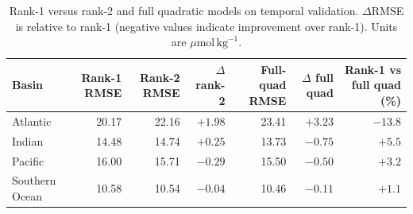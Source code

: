 \begin{table}[htbp]
\centering
\caption{Rank-1 versus rank-2 and full quadratic models on temporal validation. $\Delta$RMSE is relative to rank-1 (negative values indicate improvement over rank-1). Units are $\mu\mathrm{mol}\,\mathrm{kg}^{-1}$.}
\label{tab:rank_compare}
\begin{tabular}{lrrrrrr}
\toprule
Basin & Rank-1 RMSE & Rank-2 RMSE & $\Delta$ rank-2 & Full-quad RMSE & $\Delta$ full quad & Rank-1 vs full quad (\%) \\
\midrule
Atlantic & 20.17 & 22.16 & $+1.98$ & 23.41 & $+3.23$ & $-13.8$ \\
Indian & 14.48 & 14.74 & $+0.25$ & 13.73 & $-0.75$ & $+5.5$ \\
Pacific & 16.00 & 15.71 & $-0.29$ & 15.50 & $-0.50$ & $+3.2$ \\
Southern Ocean & 10.58 & 10.54 & $-0.04$ & 10.46 & $-0.11$ & $+1.1$ \\
\bottomrule
\end{tabular}
\end{table}
